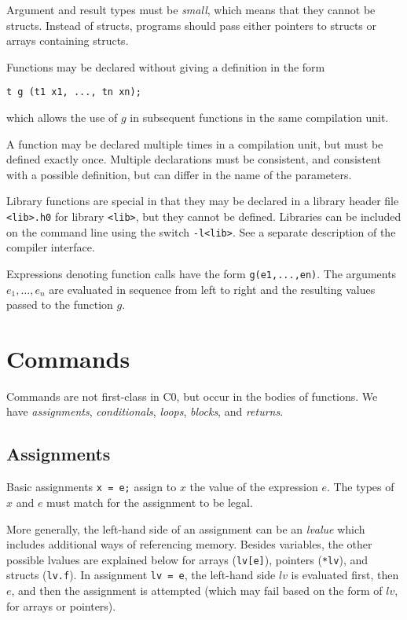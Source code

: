 \documentclass[11pt]{article}
\begin{document}
Argument and result types must be \emph{small}, which means that
they cannot be structs.  Instead of structs, programs should
pass either pointers to structs or arrays containing structs.

Functions may be declared without giving a definition in the form
\begin{verbatim}
t g (t1 x1, ..., tn xn);
\end{verbatim}
which allows the use of $g$ in subsequent functions in the same
compilation unit.

A function may be declared multiple times in a compilation unit, but
must be defined exactly once.  Multiple declarations must be
consistent, and consistent with a possible definition, but can differ
in the name of the parameters.

Library functions are special in that they may be declared in
a library header file \verb'<lib>.h0' for library \verb'<lib>', but
they cannot be defined.  Libraries can be included on the
command line using the switch \verb'-l<lib>'.  See a separate
description of the compiler interface.

Expressions denoting function calls have the form \verb'g(e1,...,en)'.
The arguments $e_1, \ldots, e_n$ are evaluated in sequence from
left to right and the resulting values passed to the function $g$.

\section{Commands}

Commands are not first-class in C0, but occur in the bodies
of functions.  We have \emph{assignments}, \emph{conditionals},
\emph{loops}, \emph{blocks}, and \emph{returns}.

\subsection{Assignments}

Basic assignments \verb'x = e;' assign to $x$ the value
of the expression $e$.  The types of $x$ and $e$ must match
for the assignment to be legal.

More generally, the left-hand side of an assignment can be an
\emph{lvalue} which includes additional ways of referencing memory.
Besides variables, the other possible lvalues are explained below for
arrays (\verb'lv[e]'), pointers (\verb'*lv'), and structs
(\verb'lv.f').  In assignment \verb'lv = e', the left-hand side
$lv$ is evaluated first, then $e$, and then the assignment is
attempted (which may fail based on the form of $lv$, for arrays
or pointers).
\end{document}
